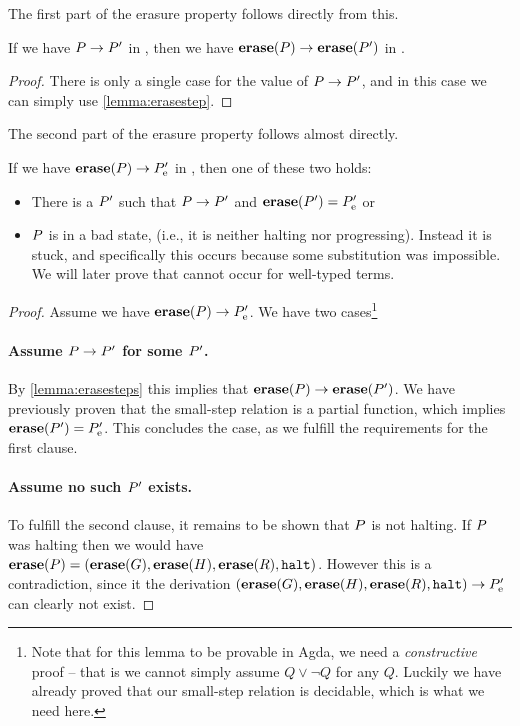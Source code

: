 The first part of the erasure property follows directly from this.

\begin{corollary}
  \label{lemma:erasesteps}
  If we have ${P} -> {P'}$ in \ATAL, then we have
  ${{\mathbf{erase}}(P)} -> {{\mathbf{erase}}(P')}$ in \ATALe.
\end{corollary}
\begin{proof}
  There is only a single case for the value of ${P} -> {P'}$, and
  in this case we can simply use \cref{lemma:erasestep}.
\end{proof}

The second part of the erasure property follows almost directly.
\begin{lemma}
  \item If we have ${{\mathbf{erase}}(P)} -> {P'_{\mathrm{e}}}$ in \ATALe, then one of
  these two holds:
  \begin{itemize}
  \item There is a $P'$ such that ${P} -> {P'}$ and
    ${\mathbf{erase}}(P') = P'_{\mathrm{e}}$ or
  \item $P$ is in a bad state, (i.e., it is neither halting nor
    progressing). Instead it is stuck, and specifically this occurs because some
    substitution was impossible. We will later prove that cannot occur for
    well-typed terms.
  \end{itemize}
\end{lemma}
\begin{proof}
  Assume we have ${{\mathbf{erase}}(P)} -> {P'_{\mathrm{e}}}$. We have two
  cases\footnote{Note that for this lemma to be provable in Agda, we need a
    \emph{constructive} proof -- that is we cannot simply assume $Q \lor \neg Q$
    for any $Q$. Luckily we have already proved that our small-step relation is
    decidable, which is what we need here.}

  \paragraph{Assume ${P} -> {P'}$ for some $P'$.} By
  \cref{lemma:erasesteps} this implies that
  ${{\mathbf{erase}}(P)} -> {{\mathbf{erase}}(P')}$. We have previously proven that
  the small-step relation is a partial function, which implies
  ${\mathbf{erase}}(P') = P'_{\mathrm{e}}$. This concludes the case, as we fulfill the
  requirements for the first clause.

  \paragraph{Assume no such $P'$ exists.} To fulfill the second clause, it
  remains to be shown that $P$ is not halting. If $P$ was halting
  then we would have
  ${\mathbf{erase}}(P) = ({\mathbf{erase}}(G), {\mathbf{erase}}(H), {\mathbf{erase}}(R),
  \mathtt{halt})$. However this is a contradiction, since it the derivation
  ${({\mathbf{erase}}(G), {\mathbf{erase}}(H), {\mathbf{erase}}(R),
    \mathtt{halt})} -> {P'_{\mathrm{e}}}$ can clearly not exist.
\end{proof}
